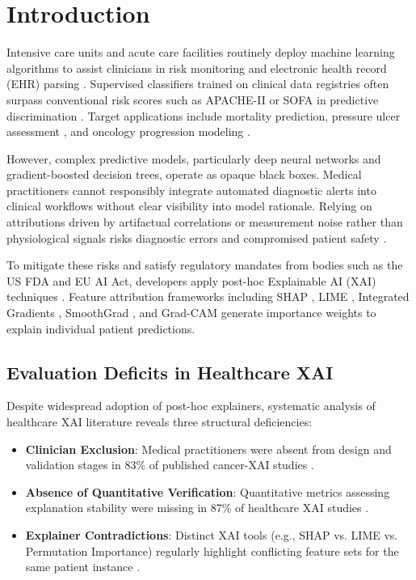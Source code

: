 \documentclass[3p,times,procedia]{elsarticle}
\theoremstyle{definition}
\begin{document}
\vspace{-6pt}
\section{Introduction}
Intensive care units and acute care facilities routinely deploy machine learning algorithms to assist clinicians in risk monitoring and electronic health record (EHR) parsing \cite{lauritsen2020early, bohlen2021explainable, ramya2023tlv}. Supervised classifiers trained on clinical data registries often surpass conventional risk scores such as APACHE-II or SOFA in predictive discrimination \cite{bohlen2021explainable, johnson2023mimic}. Target applications include mortality prediction, pressure ulcer assessment \cite{alderden2021user}, and oncology progression modeling \cite{keyl2024multimodal}.

However, complex predictive models, particularly deep neural networks and gradient-boosted decision trees, operate as opaque black boxes. Medical practitioners cannot responsibly integrate automated diagnostic alerts into clinical workflows without clear visibility into model rationale. Relying on attributions driven by artifactual correlations or measurement noise rather than physiological signals risks diagnostic errors and compromised patient safety \cite{caruana2015intelligible}.

To mitigate these risks and satisfy regulatory mandates from bodies such as the US FDA and EU AI Act, developers apply post-hoc Explainable AI (XAI) techniques \cite{ramya2023explainable}. Feature attribution frameworks including SHAP \cite{lundberg2017unified}, LIME \cite{ribeiro2016why}, Integrated Gradients \cite{sundararajan2017axiomatic}, SmoothGrad \cite{smilkov2017smoothgrad}, and Grad-CAM \cite{selvaraju2017grad} generate importance weights to explain individual patient predictions.

\subsection{Evaluation Deficits in Healthcare XAI}
Despite widespread adoption of post-hoc explainers, systematic analysis of healthcare XAI literature reveals three structural deficiencies:
\begin{itemize}\setlength{\itemsep}{0pt}\setlength{\parsep}{0pt}\setlength{\parskip}{0pt}
    \item \textbf{Clinician Exclusion}: Medical practitioners were absent from design and validation stages in 83\% of published cancer-XAI studies \cite{mohamed2024clinician}.
    \item \textbf{Absence of Quantitative Verification}: Quantitative metrics assessing explanation stability were missing in 87\% of healthcare XAI studies \cite{mohamed2024clinician}.
    \item \textbf{Explainer Contradictions}: Distinct XAI tools (e.g., SHAP vs. LIME vs. Permutation Importance) regularly highlight conflicting feature sets for the same patient instance \cite{duell2021cross, mahmood2022quantifying, krishna2022disagreement}.
\end{itemize}
\end{document}
